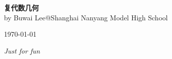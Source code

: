 \documentclass[11pt]{book}
\theoremstyle{definition}
\theoremstyle{plain}
\begin{document}
\begin{titlepage}
\setcounter{page}{-1}
\thispagestyle{empty}
	\begin{flushright}
	{\Huge\bfseries 复代数几何}\\[\baselineskip]
	{by Buwai Lee@Shanghai Nanyang Model High School}\par
	\today
	\end{flushright}
	\vfill
	{\Large\itshape Just for fun}
\end{titlepage}
\clearpage

\frontmatter
	\tableofcontents
\mainmatter
	
\end{document}
